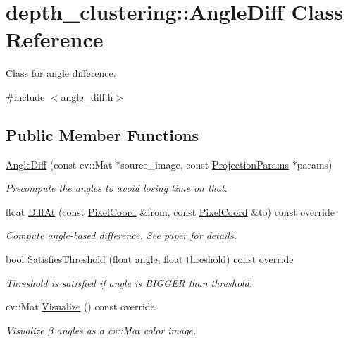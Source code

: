 \hypertarget{classdepth__clustering_1_1AngleDiff}{\section{depth\-\_\-clustering\-:\-:Angle\-Diff Class Reference}
\label{classdepth__clustering_1_1AngleDiff}
}


Class for angle difference.  




{\ttfamily \#include $<$angle\-\_\-diff.\-h$>$}

\subsection*{Public Member Functions}
\begin{DoxyCompactItemize}
\item 
\hyperlink{classdepth__clustering_1_1AngleDiff_a40371150bff3a10dd8ce40788b9bd160}{Angle\-Diff} (const cv\-::\-Mat $\ast$source\-\_\-image, const \hyperlink{classdepth__clustering_1_1ProjectionParams}{Projection\-Params} $\ast$params)
\begin{DoxyCompactList}\small\item\em Precompute the angles to avoid losing time on that. \end{DoxyCompactList}\item 
float \hyperlink{classdepth__clustering_1_1AngleDiff_ac9bd0ec61ff0b213fd19235dc171c1c2}{Diff\-At} (const \hyperlink{structdepth__clustering_1_1PixelCoord}{Pixel\-Coord} \&from, const \hyperlink{structdepth__clustering_1_1PixelCoord}{Pixel\-Coord} \&to) const override
\begin{DoxyCompactList}\small\item\em Compute angle-\/based difference. See paper for details. \end{DoxyCompactList}\item 
\hypertarget{classdepth__clustering_1_1AngleDiff_ac65e8f42b1f2ac82db14ebe188c004a2}{bool \hyperlink{classdepth__clustering_1_1AngleDiff_ac65e8f42b1f2ac82db14ebe188c004a2}{Satisfies\-Threshold} (float angle, float threshold) const override}\label{classdepth__clustering_1_1AngleDiff_ac65e8f42b1f2ac82db14ebe188c004a2}

\begin{DoxyCompactList}\small\item\em Threshold is satisfied if angle is B\-I\-G\-G\-E\-R than threshold. \end{DoxyCompactList}\item 
cv\-::\-Mat \hyperlink{classdepth__clustering_1_1AngleDiff_a462e4aadd35ca06e9b061d08c9787074}{Visualize} () const override
\begin{DoxyCompactList}\small\item\em Visualize $\beta$ angles as a {\ttfamily cv\-::\-Mat} color image. \end{DoxyCompactList}\end{DoxyCompactItemize}
